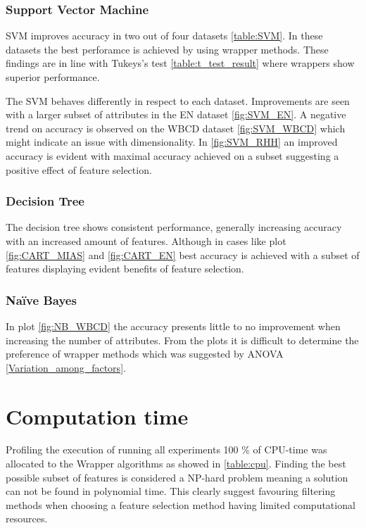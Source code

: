 \subsubsection{Support Vector Machine}

SVM improves accuracy in two out of four datasets \ref{table:SVM}. In these datasets the best perforamce is achieved by using wrapper methods. These findings are in line with Tukeys's test \ref{table:t_test_result} where wrappers show superior performance.

The SVM behaves differently in respect to each dataset. Improvements are seen with a larger subset of attributes in the EN dataset \ref{fig:SVM_EN}. A negative trend on accuracy is observed on the WBCD dataset \ref{fig:SVM_WBCD} which might indicate an issue with dimensionality. In \ref{fig:SVM_RHH} an improved accuracy is evident with maximal accuracy achieved on a subset suggesting a positive effect of feature selection.

\subsubsection{Decision Tree}

The decision tree shows consistent performance, generally increasing accuracy with an increased amount of features. Although in cases like plot \ref{fig:CART_MIAS} and \ref{fig:CART_EN} best accuracy is achieved with a subset of features displaying evident benefits of feature selection.

\subsubsection{Naïve Bayes}

In plot \ref{fig:NB_WBCD} the accuracy presents little to no improvement when increasing the number of attributes. From the plots it is difficult to determine the preference of wrapper methods which was suggested by ANOVA \ref{Variation_among_factors}.






\newpage
\section{Computation time}

Profiling the execution of running all experiments 100 \% of CPU-time was allocated to the Wrapper algorithms as showed in \ref{table:cpu}. Finding the best possible subset of features is considered a NP-hard problem meaning a solution can not be found in polynomial time. This clearly suggest favouring filtering methods when choosing a feature selection method having limited computational resources.

